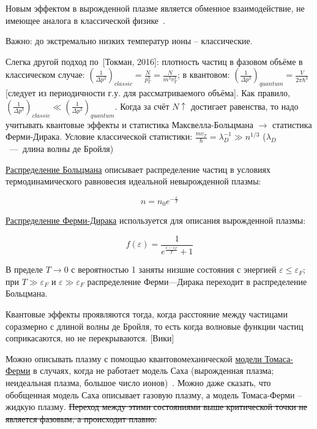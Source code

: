 \documentclass[10pt, a4paper]{article}
\newcommand{\Tokman}{~[Токман, 2016]}
\begin{document}
Новым эффектом в вырожденной плазме является обменное взаимодействие, не имеющее аналога в классической физике~\cite{kotelnikov}.

Важно: до экстремально низких температур ионы -- классические.

Слегка другой подход по\Tokman: плотность частиц в фазовом объёме в классическом случае: $\left( \frac{1}{\Delta p^3}\right)_{classic} = \frac{N}{p_T^3} = \frac{N}{m^3v_T^3}$; в квантовом: $\left(\frac{1}{\Delta p^3}\right)_{quantum} = \frac{V}{2 \pi \hbar^3}$ [следует из периодичности г.у. для рассматриваемого объёма]. Как правило, $\left( \frac{1}{\Delta p^3}\right)_{classic} \ll \left(\frac{1}{\Delta p^3}\right)_{quantum}$. Когда за счёт $N\uparrow$ достигает равенства, то надо учитывать квантовые эффекты и статистика Максвелла-Больцмана $\rightarrow$ статистика Ферми-Дирака. Условие классической статистики: $\frac{mv_T}{\hbar} = \lambda_D^{-1} \gg n^{1/3}$ ($\lambda_D$~---~длина волны де Бройля)

\uline{Распределение Больцмана} описывает распределение частиц в условиях термодинамического равновесия идеальной невырожденной плазмы:

\begin{equation}
	n = n_0e^{-\frac{\varepsilon}{T}}
\end{equation}

\uline{Распределение Ферми-Дирака} используется для описания вырожденной плазмы:

\begin{equation}
	f(\varepsilon) = \frac{1}{e^{\frac{\varepsilon-\varepsilon_F}{T}}+1}
\end{equation}

В пределе $T\rightarrow 0$ с вероятностью 1 заняты низшие состояния с энергией $\varepsilon \leq \varepsilon_F$; при $T \gg \varepsilon_F$ и $\varepsilon \gg \varepsilon_F$ распределение Ферми—Дирака переходит в распределение Больцмана.

Квантовые эффекты проявляются тогда, когда расстояние между частицами соразмерно с длиной волны де Бройля, то есть когда волновые функции частиц соприкасаются, но не перекрываются. [Вики]

Можно описывать плазму с помощью квантовомеханической \uline{модели Томаса-Ферми} в случаях, когда не работает модель Саха (вырожденная плазма; неидеальная плазма, большое число ионов)~\cite{kalitkin}. Можно даже сказать, что обобщенная модель Саха описывает газовую плазму, а модель Томаса-Ферми -- жидкую плазму. \sout{Переход между этими состояниями выше критической точки не является фазовым, а происходит плавно.}
\end{document}
